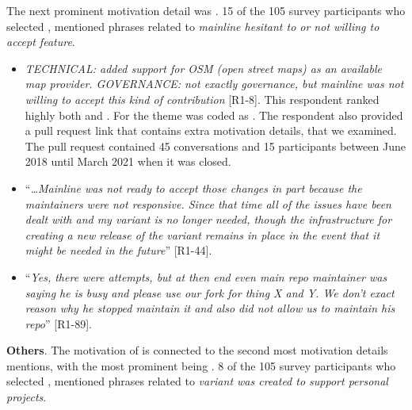 \nd The next prominent  motivation detail was .
15 of the 105 survey participants who selected , mentioned phrases related to \emph{mainline hesitant to or not willing to accept feature}.

\begin{itemize}[leftmargin=*]
\item \emph{TECHNICAL: added support for OSM (open street maps) as an available map provider. GOVERNANCE: not exactly governance, but mainline was not willing to accept this kind of contribution} [R1-8]. This respondent ranked highly both  and . For  the theme was coded as . The respondent also provided a \gh pull request link that contains extra motivation details, that we examined. The pull request contained 45 conversations and 15 participants between June 2018 until March 2021 when it was closed.

\item ``\emph{\ldots Mainline was not ready to accept those changes in part because the maintainers were not responsive. Since that time all of the issues have been dealt with and my variant is no longer needed, though the infrastructure for creating a new release of the variant remains in place in the event that it might be needed in the future}'' [R1-44].

\item ``\emph{Yes, there were attempts, but at then end even main repo maintainer was saying he is busy and please use our fork for thing X and Y. We don't exact reason why he stopped maintain it and also did not allow us to maintain his repo}'' [R1-89]. 

\end{itemize}


\nd \textbf{Others}. The motivation of  is connected to the second most motivation details mentions, with the most prominent being . 8 of the 105 survey participants who selected , mentioned phrases related to \emph{variant was created to support personal projects}.


